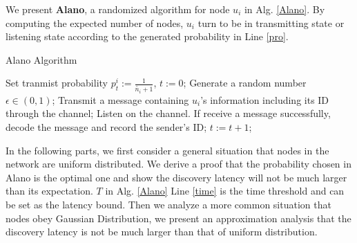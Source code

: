 We present \textbf{Alano}, a randomized algorithm for node $u_i$ in Alg. \ref{Alano}.
By computing the expected number of nodes, $u_i$ turn to be in transmitting state or listening state according to the generated probability in Line \ref{pro}.


\begin{algorithm}
\caption{Alano Algorithm}
\label{Alano}
\begin{algorithmic}[1]
\STATE Set tranmist probability $p_t^i := \frac{1}{\widetilde{n_i}+1}$, $t := 0$;  \label{pro}
		\label{time}%
	\STATE Generate a random number $\epsilon \in (0,1)$;  
    		\STATE Transmit a message containing $u_i$'s information including its ID through the channel;
	\ELSE
    		\STATE Listen on the channel. If receive a message successfully, decode the message and record the sender's ID;
	\ENDIF
	\STATE $t:= t+1$;
\ENDWHILE
\end{algorithmic}
\end{algorithm}

In the following parts, we first consider a general situation that nodes in the network are uniform distributed. We derive a proof that the probability chosen in Alano is the optimal one and show the discovery latency will not be much larger than its expectation. $T$ in Alg. \ref{Alano} Line \ref{time} is the time threshold and can be set as the latency bound. Then we analyze a more common situation that nodes obey Gaussian Distribution, we present an approximation analysis that the discovery latency is not be much larger than that of uniform distribution.


